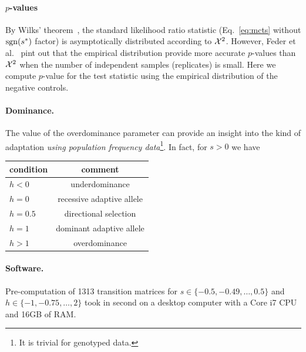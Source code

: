 \documentclass[11pt]{article}
\begin{document}
\paragraph{$p$-values}
By Wilks’ theorem~\cite{williams2001weighing}, the
standard likelihood ratio statistic (Eq.~\ref{eq:mcts} without
$\operatorname{sgn}(s^*)$ factor) is asymptotically distributed according to
${\cal X}^2$. However, Feder et al.~\cite{feder2014Identifying} pint out
that the empirical distribution provide more accurate $p$-values than
${\cal X}^2$ when the number of independent samples (replicates) is small.
Here we compute $p$-value for the test statistic using the empirical
distribution of the negative controls.


\paragraph{Dominance.}
The value of the overdominance parameter can provide an insight into the kind of adaptation \emph{using population frequency data}\footnote{It is trivial for genotyped data.}. In fact, for $s>0$ we have \cite{gillespie2010population}  
\begin{center}
	\begin{tabular}{l|c}
		condition & comment\\
		\hline
		$h<0$ &  underdominance\\
		$h=0$ & recessive adaptive allele\\
		$h=0.5$ & directional selection\\
		$h=1$&	dominant adaptive allele	\\
		$h>1$ &overdominance
		\end{tabular}
		\end{center}
		
\paragraph{Software.}
Pre-computation of 1313 transition matrices for $s\in\{-0.5,-0.49,\ldots,0.5 \}$ and $h\in \{-1,-0.75,\ldots,2\}$ took in second on a desktop computer with a Core i7 CPU and 16GB of RAM.
\end{document}
